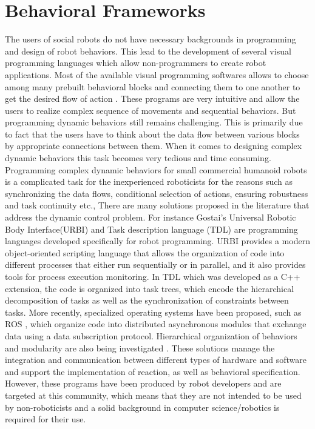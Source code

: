 {\section{Behavioral Frameworks} %
The users of social robots do not have necessary backgrounds in programming and design of robot behaviors. This lead to the development of several visual programming languages which allow non-programmers to create robot applications. Most of the available visual programming softwares allows to choose among many prebuilt behavioral blocks and connecting them to one another to get the desired flow of action \cite{MSRS4} \cite{Choregraphe}. These programs are very intuitive and allow the users to realize complex sequence of movements and sequential behaviors. But programming dynamic behaviors still remains challenging. This is primarily due to fact that the users have to think about the data flow between various blocks by appropriate connections between them. When it comes to designing complex dynamic behaviors this task becomes very tedious and time consuming.  Programming complex dynamic behaviors for small commercial humanoid robots is a complicated task for the inexperienced roboticists \cite{berenz2014targets} for the reasons such as synchronizing the data flows, conditional selection of actions, ensuring robustness and task continuity etc., There are many solutions  proposed in the literature that address the dynamic control problem. For instance Gostai's Universal Robotic Body Interface(URBI) \cite{baillie2008urbi} and Task description language (TDL) \cite{simmons1998task} are programming languages developed specifically for robot programming. URBI provides a modern object-oriented scripting language that allows the organization of code into different processes that either run sequentially or in parallel, and it also provides tools for process execution monitoring. In TDL which was developed as a C++ extension, the code is organized into task trees, which encode the hierarchical decomposition of tasks as well as the synchronization of constraints between tasks. More recently, specialized operating systems have been proposed, such as ROS \cite{quigley2009ros}, which organize code into distributed asynchronous modules that exchange data using a data subscription protocol. Hierarchical organization of behaviors and modularity are also being investigated \cite{jaeger1998dual} \cite{Baldassarre:2013:CRM:2560111} \cite{hurdus2008behavioral}. These solutions manage the integration and communication between different types of hardware and software and support the implementation of reaction, as well as behavioral specification. However, these programs have been produced by robot developers and are targeted at this community, which means that they are not intended to be used by non-roboticists and a solid background in computer science/robotics is required for their use.
}
